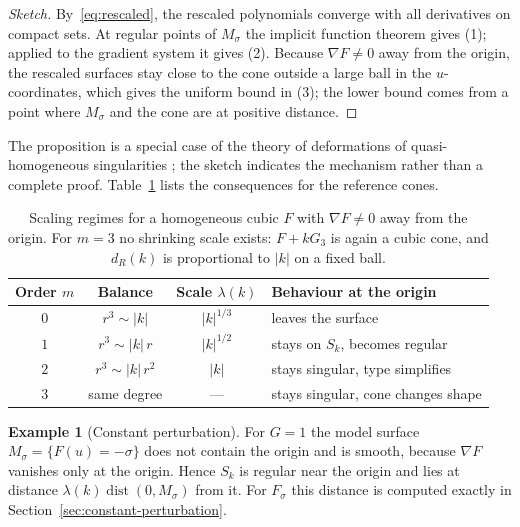 \documentclass[12pt, a4paper, oneside]{book}
\theoremstyle{plain}
\theoremstyle{definition}
\newtheorem{example}[theorem]{Example}
\theoremstyle{remark}
\begin{document}
\begin{proof}[Sketch]
By~\eqref{eq:rescaled}, the rescaled polynomials converge with all derivatives
on compact sets. At regular points of $M_\sigma$ the implicit function theorem
gives (1); applied to the gradient system it gives (2). Because
$\nabla F\neq0$ away from the origin, the rescaled surfaces stay close to the
cone outside a large ball in the $u$-coordinates, which gives the uniform
bound in (3); the lower bound comes from a point where $M_\sigma$ and the cone
are at positive distance.
\end{proof}

The proposition is a special case of the theory of deformations of
quasi-homogeneous singularities
\cite{arnold2012singularities,greuel2007introduction}; the sketch indicates the
mechanism rather than a complete proof. Table~\ref{tab:scaling} lists the
consequences for the reference cones.

\begin{table}[!h]
\centering
\small
\begin{tabular}{c c c l}
\toprule
Order $m$ & Balance & Scale $\lambda(k)$ & Behaviour at the origin \\
\midrule
$0$ & $r^3\sim|k|$       & $|k|^{1/3}$ & leaves the surface \\
$1$ & $r^3\sim|k|\,r$    & $|k|^{1/2}$ & stays on $S_k$, becomes regular \\
$2$ & $r^3\sim|k|\,r^2$  & $|k|$       & stays singular, type simplifies \\
$3$ & same degree        & ---         & stays singular, cone changes shape \\
\bottomrule
\end{tabular}
\caption[Scaling regimes]{Scaling regimes for a homogeneous cubic $F$ with
$\nabla F\neq0$ away from the origin. For $m=3$ no shrinking scale exists:
$F+kG_3$ is again a cubic cone, and $d_R(k)$ is proportional to $|k|$ on a
fixed ball.}
\label{tab:scaling}
\end{table}

\begin{example}[Constant perturbation]
For $G=1$ the model surface $M_\sigma=\{F(u)=-\sigma\}$ does not contain the
origin and is smooth, because $\nabla F$ vanishes only at the origin. Hence
$S_k$ is regular near the origin and lies at distance
$\lambda(k)\operatorname{dist}(0,M_\sigma)$ from it. For $F_\sigma$ this
distance is computed exactly in Section~\ref{sec:constant-perturbation}.
\end{example}
\end{document}
